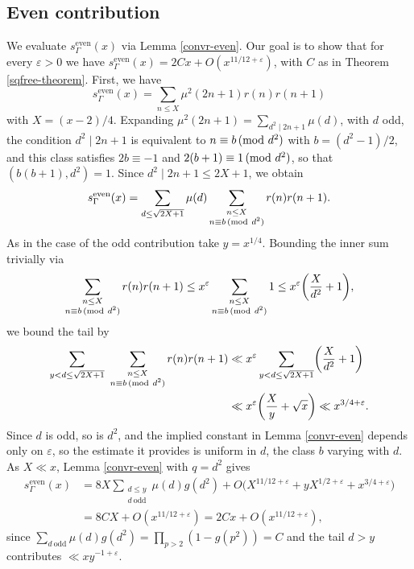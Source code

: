 \documentclass[12pt]{amsart}
\theoremstyle{remark}
\renewcommand{\pmod}[1]{\mkern3mu(\mathrm{mod}\ #1)}
\begin{document}
\subsection{Even contribution}
We evaluate $s_{\Gamma}^{\mathrm{even}}(x)$
via Lemma \ref{convr-even}.
Our goal is to show that for every $\varepsilon > 0$ we have $s_{\Gamma}^{\text{even}}(x) = 2Cx+O(x^{11/12+\varepsilon})$,
with $C$ as in Theorem \ref{sqfree-theorem}.
First, we have 
\[
    s_{\Gamma}^{\mathrm{even}}(x)=\sum_{n \le X}\mu^2(2n+1)r(n)r(n+1)
\]
with $X=(x-2)/4$. 
Expanding $\mu^2(2n+1) = \sum_{d^2 \mid 2n+1}\mu(d)$, with $d$ odd, the condition
$d^2 \mid 2n+1$ is equivalent to $n \equiv b \pmod{d^2}$ with $b = (d^2-1)/2$,
and this class satisfies $2b \equiv -1$ and $2(b+1) \equiv 1 \pmod{d^2}$, so
that $(b(b+1),d^2) = 1$. Since $d^2 \mid 2n+1 \le 2X+1$, we obtain
\[
    s_{\Gamma}^{\mathrm{even}}(x) = \sum_{d \le \sqrt{2X+1}} \mu(d)
    \sum_{\substack{n \le X\\ n \equiv b \pmod{d^2}}} r(n)r(n+1).
\]
As in the case of the odd contribution take $y = x^{1/4}$. Bounding the inner
sum trivially via
\[
    \sum_{\substack{n \le X\\ n \equiv b \pmod{d^2}}} r(n)r(n+1)
    \le x^{\varepsilon}\sum_{\substack{n \le X\\ n \equiv b \pmod{d^2}}} 1
    \le x^{\varepsilon}\biggl(\frac{X}{d^2}+1\biggr),
\]
we bound the tail by
\[
    \begin{split}
        \sum_{y < d \le \sqrt{2X+1}}\ \sum_{\substack{n \le X\\ n \equiv b \pmod{d^2}}}
        r(n)r(n+1)
        &\ll x^{\varepsilon}\sum_{y < d \le \sqrt{2X+1}}\biggl(\frac{X}{d^2}+1\biggr)\\
        &\ll x^{\varepsilon}\biggl(\frac{X}{y}+\sqrt{x}\biggr) \ll x^{3/4+\varepsilon}.
    \end{split}
\]
Since $d$ is odd, so is $d^2$, and the implied constant in Lemma
\ref{convr-even} depends only on $\varepsilon$, so the estimate it provides is
uniform in $d$, the class $b$ varying with $d$. As $X \ll x$, Lemma
\ref{convr-even} with $q = d^2$ gives
\begin{equation} \label{sq-free-even-contrib}
    \begin{split}
        s_{\Gamma}^{\text{even}}(x) &= 8X\sum_{\substack{d\le y\\ d\ \mathrm{odd}}}\mu(d)g(d^2) + O\bigl(X^{11/12+\varepsilon}+yX^{1/2+\varepsilon}+x^{3/4+\varepsilon}\bigr)\\
        &= 8CX + O(x^{11/12+\varepsilon}) = 2Cx + O(x^{11/12+\varepsilon}),
    \end{split}
\end{equation}
since $\sum_{d\ \mathrm{odd}}\mu(d)g(d^2)=\prod_{p>2}(1-g(p^2))=C$ and the tail $d > y$ contributes $ \ll x y^{-1+\varepsilon}$.
\end{document}
